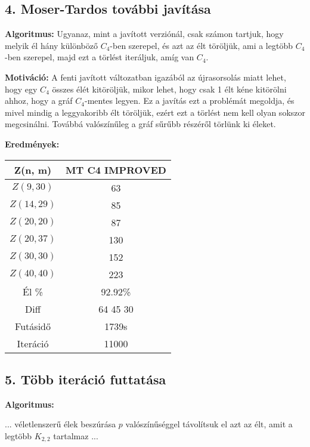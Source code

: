 \documentclass[12pt,a4paper]{article}
\begin{document}
\subsection*{4. Moser-Tardos további javítása}

\textbf{Algoritmus:} Ugyanaz, mint a javított verziónál, csak számon tartjuk, hogy melyik él hány különböző $C_4$-ben szerepel, és azt az élt töröljük, ami a legtöbb $C_4$-ben szerepel, majd ezt a törlést iteráljuk, amíg van $C_4$.

\textbf{Motiváció:} A fenti javított változatban igazából az újrasorsolás miatt lehet, hogy egy $C_4$ összes élét kitöröljük, mikor lehet, hogy csak 1 élt kéne kitörölni ahhoz, hogy a gráf $C_4$-mentes legyen. Ez a javítás ezt a problémát megoldja, és mivel mindig a leggyakoribb élt töröljük, ezért ezt a törlést nem kell olyan sokszor megcsinálni. Továbbá valószínűleg a gráf sűrűbb részéről törlünk ki éleket.

\textbf{Eredmények:}
\begin{table}[H]
\centering
\begin{tabular}{|c|c|}
\hline
\textbf{Z(n, m)} & \textbf{MT C4 IMPROVED} \\
\hline
$Z(9,30)$  & 63 \\
$Z(14, 29)$ & 85 \\
$Z(20, 20)$ & 87 \\
$Z(20, 37)$ & 130 \\
$Z(30, 30)$ & 152 \\
$Z(40, 40)$ & 223 \\
\hline
Él \% & 92.92\% \\
\hline
Diff & 64 45 30 \\
\hline
Futásidő & 1739s \\
Iteráció & 11000 \\
\hline
\end{tabular}
\end{table}

\subsection*{5. Több iteráció futtatása}
\textbf{Algoritmus:}

\begin{algorithm}[H]
\begin{algorithmic}[1]
    \State ...
        \State véletlenszerű élek beszúrása $p$ valószínűséggel
            \State távolítsuk el azt az $\text{élt}$, amit a legtöbb $K_{2,2}$ tartalmaz
        \EndWhile
    \EndFor
    \State ...
\end{algorithmic}
\end{algorithm}
\end{document}
